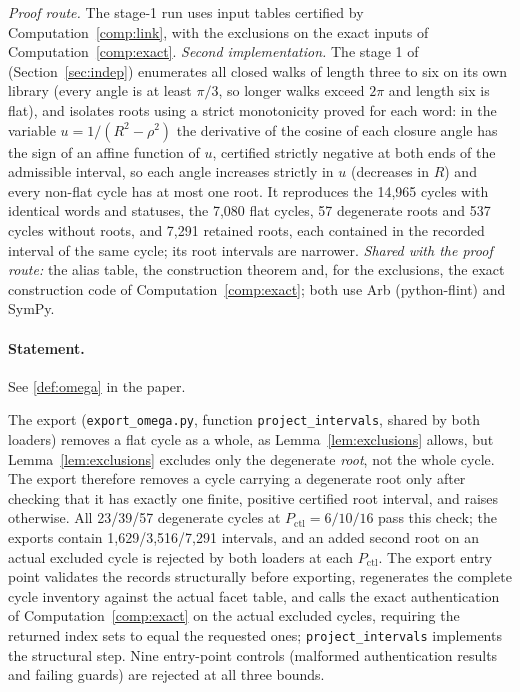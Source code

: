 \documentclass[11pt]{article}
\theoremstyle{definition}
\theoremstyle{remark}
\newcommand{\file}[1]{\path{#1}}
\begin{document}
\emph{Proof route.} The stage-1 run uses input tables certified by
Computation~\ref{comp:link}, with the exclusions on the exact inputs of
Computation~\ref{comp:exact}. \emph{Second implementation.} The stage 1 of
\file{checks/independent-s1-b2/} (Section~\ref{sec:indep}) enumerates all closed
walks of length three to six on its own library (every angle is at least
$\pi/3$, so longer walks exceed $2\pi$ and length six is flat), and isolates
roots using a strict monotonicity proved for each word: in the variable
$u=1/(R^2-\rho^2)$ the derivative of the cosine of each closure angle has
the sign of an affine function of $u$, certified strictly negative at both
ends of the admissible interval, so each angle increases strictly in $u$
(decreases in $R$) and every non-flat cycle has at most one root. It reproduces the 14,965
cycles with identical words and statuses, the 7,080 flat cycles, 57
degenerate roots and 537 cycles without roots, and 7,291 retained roots,
each contained in the recorded interval of the same cycle; its root
intervals are narrower. \emph{Shared with the proof route:} the alias
table, the construction theorem and, for the exclusions, the exact
construction code of Computation~\ref{comp:exact}; both use Arb
(python-flint) and SymPy.

\setcounter{theorem}{1}
\paragraph{Statement.} See \ref{def:omega} in the paper.


The export (\texttt{export\_omega.py}, function
\texttt{project\_intervals}, shared by both loaders) removes a flat cycle
as a whole, as Lemma~\ref{lem:exclusions} allows, but Lemma~\ref{lem:exclusions}
excludes only the degenerate \emph{root}, not the whole cycle. The export
therefore removes a cycle carrying a degenerate root only after checking
that it has exactly one finite, positive certified root interval, and
raises otherwise. All 23/39/57 degenerate cycles at
$P_{\mathrm{ctl}}=6/10/16$ pass this check; the exports contain
1,629/3,516/7,291 intervals, and
an added second root on an actual excluded cycle is rejected by both
loaders at each $P_{\mathrm{ctl}}$. The export entry
point validates the records structurally before exporting, regenerates the complete
cycle inventory against the actual facet table, and calls the exact
authentication of Computation~\ref{comp:exact} on the actual excluded
cycles, requiring the returned index sets to equal the requested ones;
\texttt{project\_intervals} implements the structural step. Nine
entry-point controls (malformed authentication results and failing guards)
are rejected at all three bounds.
\end{document}
